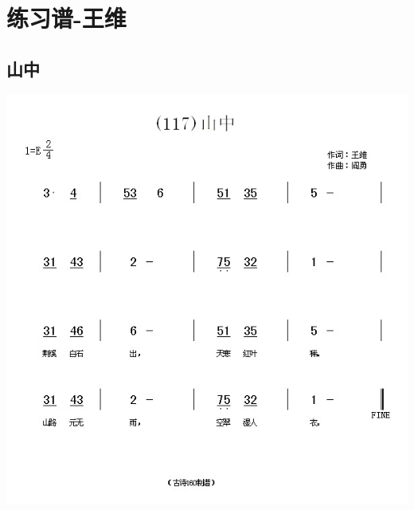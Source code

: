 \documentclass[cn,pad,chinesefont=nofont,twocol]{elegantbook}
\begin{document}
     
\chapter{练习谱-王维}
\section{山中}
    \includegraphics[width=\textwidth]{dongxiao/20200627-王维-山中.jpg}  
\end{document}
